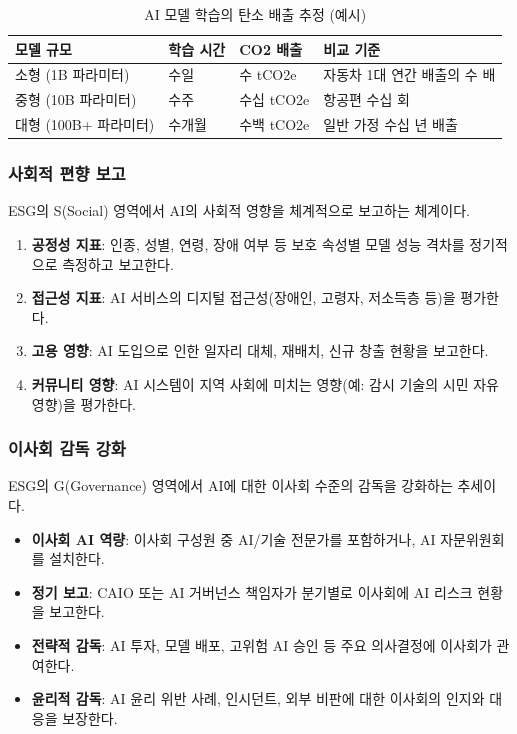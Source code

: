 \begin{table}[htbp]
\centering
\caption{AI 모델 학습의 탄소 배출 추정 (예시)}
\label{tab:20_carbon}
\begin{tabularx}{\textwidth}{p{3cm}p{2.5cm}p{2.5cm}X}
\toprule
\textbf{모델 규모} & \textbf{학습 시간} & \textbf{CO2 배출} & \textbf{비교 기준} \\
\midrule
소형 (1B 파라미터) & 수일 & 수 tCO2e & 자동차 1대 연간 배출의 수 배 \\
중형 (10B 파라미터) & 수주 & 수십 tCO2e & 항공편 수십 회 \\
대형 (100B+ 파라미터) & 수개월 & 수백 tCO2e & 일반 가정 수십 년 배출 \\
\bottomrule
\end{tabularx}
\end{table}

\subsubsection{사회적 편향 보고}

ESG의 S(Social) 영역에서 AI의 사회적 영향을 체계적으로 보고하는 체계이다.

\begin{enumerate}
 \item \textbf{공정성 지표}: 인종, 성별, 연령, 장애 여부 등 보호 속성별 모델 성능 격차를 정기적으로 측정하고 보고한다.
 \item \textbf{접근성 지표}: AI 서비스의 디지털 접근성(장애인, 고령자, 저소득층 등)을 평가한다.
 \item \textbf{고용 영향}: AI 도입으로 인한 일자리 대체, 재배치, 신규 창출 현황을 보고한다.
 \item \textbf{커뮤니티 영향}: AI 시스템이 지역 사회에 미치는 영향(예: 감시 기술의 시민 자유 영향)을 평가한다.
\end{enumerate}

\subsubsection{이사회 감독 강화}

ESG의 G(Governance) 영역에서 AI에 대한 이사회 수준의 감독을 강화하는 추세이다.

\begin{itemize}
 \item \textbf{이사회 AI 역량}: 이사회 구성원 중 AI/기술 전문가를 포함하거나, AI 자문위원회를 설치한다.
 \item \textbf{정기 보고}: CAIO 또는 AI 거버넌스 책임자가 분기별로 이사회에 AI 리스크 현황을 보고한다.
 \item \textbf{전략적 감독}: AI 투자, 모델 배포, 고위험 AI 승인 등 주요 의사결정에 이사회가 관여한다.
 \item \textbf{윤리적 감독}: AI 윤리 위반 사례, 인시던트, 외부 비판에 대한 이사회의 인지와 대응을 보장한다.
\end{itemize}

